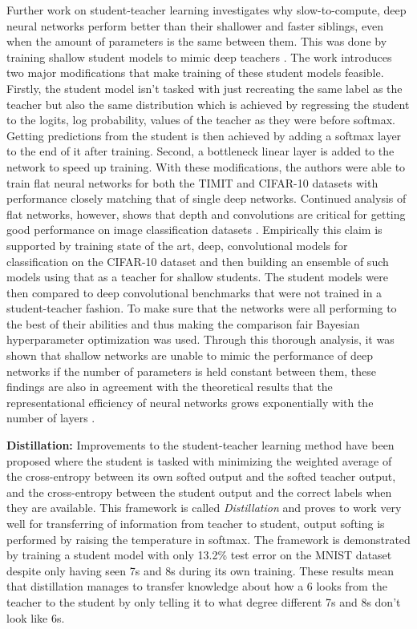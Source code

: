 \documentclass{kththesis}
\newcommand{\bibentry}[1]{\parencite{#1}}
\newcommand{\subsubsubsection}[1]{\vspace{5px}\noindent\textbf{#1:}}
\begin{document}
Further work on student-teacher learning investigates why slow-to-compute, deep
neural networks perform better than their shallower and faster siblings, even when
the amount of parameters is the same between them.
This was done by training shallow student models to mimic
deep teachers \bibentry{ba2014deep}. The work introduces two major modifications
that make training of these student models feasible. Firstly, the student model
isn't tasked with just recreating the same label as the teacher but also the
same distribution which is achieved by regressing the student to the logits, log
probability, values of the teacher as they were before softmax. Getting
predictions from the student is then achieved by adding a softmax layer to the
end of it after training. Second, a bottleneck linear layer is added to the
network to speed up training. With these modifications, the authors were able to train
flat neural networks for both the TIMIT \parencite[]{TIMIT} and CIFAR-10 \parencite[]{CIFAR} datasets with performance
closely matching that of single deep networks. Continued analysis of flat
networks, however, shows that depth and convolutions are critical for getting good
performance on image classification datasets \bibentry{urban2016deep}.
Empirically this claim is supported by training state of the art, deep,
convolutional models for classification on the CIFAR-10 dataset and then
building an ensemble of such models using that as a teacher for shallow
students. The student models were then compared to deep convolutional benchmarks
that were not trained in a student-teacher fashion. To make sure that the
networks were all performing to the best of their abilities and thus making the
comparison fair Bayesian hyperparameter optimization
\bibentry{snoek2012practical} was used. Through this thorough analysis, it was
shown that shallow networks are unable to mimic the performance of deep networks
if the number of parameters is held constant between them, these findings are
also in agreement with the theoretical results that the representational
efficiency of neural networks grows exponentially with the number of layers
\bibentry{liang2016deep}. 

\subsubsubsection{Distillation}
Improvements to the student-teacher learning method have been proposed where the
student is tasked with minimizing the weighted average of the cross-entropy
between its own softed output and the softed teacher output, and the cross-entropy
between the student output and the correct labels when they are available. This
framework is called \emph{Distillation} \bibentry{hinton2015distilling} and
proves to work very well for transferring of information from teacher to
student, output softing is performed by raising the temperature in softmax.
The framework is demonstrated by training a student model with only
13.2\% test error on the MNIST dataset despite only having seen 7s and 8s during
its own training. These results mean that distillation manages to transfer
knowledge about how a 6 looks from the teacher to the student by only telling it
to what degree different 7s and 8s don't look like 6s. 
\end{document}
